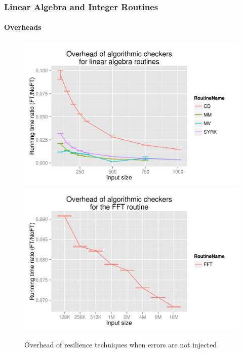 \documentclass{sig-alternate}
\begin{document}
\subsubsection{Linear Algebra and Integer Routines}
\label{sec:res_tech:eval:la_int}

\paragraph{Overheads}

\begin{figure}[ht!]
\centering
\includegraphics[width=1.00\columnwidth]{figs/4_1_1_Exp1_linalg}
\includegraphics[width=1.00\columnwidth]{figs/4_1_1_Exp1_fft}
\caption{Overhead of resilience techniques when errors are not injected}
\label{fig:routine_detect_ovhd}
\end{figure}
\end{document}
